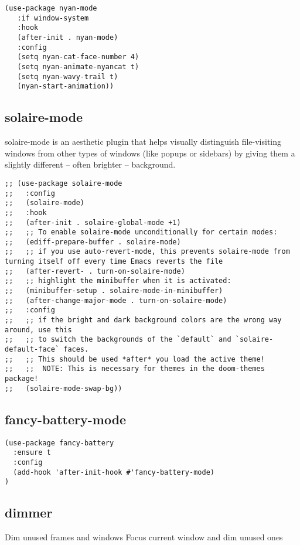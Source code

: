 \documentclass[11pt]{article}
\begin{document}
\begin{verbatim}
(use-package nyan-mode
   :if window-system
   :hook
   (after-init . nyan-mode)
   :config
   (setq nyan-cat-face-number 4)
   (setq nyan-animate-nyancat t)
   (setq nyan-wavy-trail t)
   (nyan-start-animation))
\end{verbatim}

\subsection*{solaire-mode}
\label{sec:orgada7d9b}

solaire-mode is an aesthetic plugin that helps visually distinguish
file-visiting windows from other types of windows (like popups or sidebars)
by giving them a slightly different -- often brighter -- background.

\begin{verbatim}
;; (use-package solaire-mode
;;   :config
;;   (solaire-mode)
;;   :hook
;;   (after-init . solaire-global-mode +1)
;;   ;; To enable solaire-mode unconditionally for certain modes:
;;   (ediff-prepare-buffer . solaire-mode)
;;   ;; if you use auto-revert-mode, this prevents solaire-mode from turning itself off every time Emacs reverts the file
;;   (after-revert- . turn-on-solaire-mode)
;;   ;; highlight the minibuffer when it is activated:
;;   (minibuffer-setup . solaire-mode-in-minibuffer)
;;   (after-change-major-mode . turn-on-solaire-mode)
;;   :config
;;   ;; if the bright and dark background colors are the wrong way around, use this
;;   ;; to switch the backgrounds of the `default` and `solaire-default-face` faces.
;;   ;; This should be used *after* you load the active theme!
;;   ;;  NOTE: This is necessary for themes in the doom-themes package!
;;   (solaire-mode-swap-bg))
\end{verbatim}

\subsection*{fancy-battery-mode}
\label{sec:org1e3774d}
\begin{verbatim}
(use-package fancy-battery
  :ensure t
  :config
  (add-hook 'after-init-hook #'fancy-battery-mode)
)
\end{verbatim}
\subsection*{dimmer}
\label{sec:org10ebee5}

Dim unused frames and windows
Focus current window and dim unused ones
\end{document}
